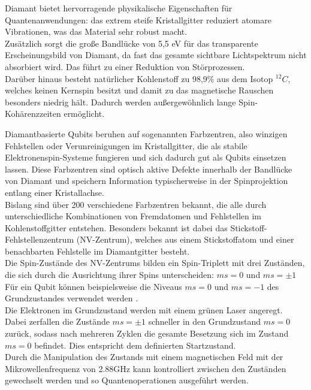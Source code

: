 Diamant bietet hervorragende physikalische Eigenschaften für Quantenanwendungen: das extrem steife Kristallgitter reduziert atomare Vibrationen, was das Material sehr robust macht. \\
Zusätzlich sorgt die große Bandlücke von 5,5 eV für das transparente Erscheinungsbild von Diamant, da fast das gesamte sichtbare Lichtspektrum nicht absorbiert wird. Das führt zu einer Reduktion von Störprozessen. \\
Darüber hinaus besteht natürlicher Kohlenstoff zu 98,9\% aus dem Isotop ${}^{12}C$, welches keinen Kernspin besitzt und damit zu das magnetische Rauschen besonders niedrig hält. Dadurch werden außergewöhnlich lange Spin-Kohärenzzeiten ermöglicht. 




Diamantbasierte Qubits beruhen auf sogenannten Farbzentren, also winzigen Fehlstellen oder Verunreinigungen im Kristallgitter, die als stabile Elektronenspin-Systeme fungieren und sich dadurch gut als Qubits einsetzen lassen. Diese Farbzentren sind optisch aktive Defekte innerhalb der Bandlücke von Diamant und speichern Information typischerweise in der Spinprojektion entlang einer Kristallachse. \\

Bislang sind über 200 verschiedene Farbzentren bekannt, die alle durch unterschiedliche Kombinationen von Fremdatomen und Fehlstellen im Kohlenstoffgitter entstehen. Besonders bekannt ist dabei das Stickstoff-Fehlstellenzentrum (NV-Zentrum), welches aus einem Stickstoffatom und einer benachbarten Fehlstelle im Diamantgitter besteht. \\

Die Spin-Zustände des NV-Zentrums bilden ein Spin-Triplett mit drei Zuständen, die sich durch die Ausrichtung ihrer Spins unterscheiden: $ms = 0$ und $ms = \pm 1$
Für ein Qubit können beispielsweise die Niveaus $ms = 0$ und $ms = -1$ des Grundzustandes verwendet werden . \\
Die Elektronen im Grundzustand werden mit einem grünen Laser angeregt. Dabei zerfallen die Zustände $ms = \pm 1$ schneller in den Grundzustand $ms=0$ zurück, sodass nach mehreren Zyklen die gesamte Besetzung sich im Zustand $ms=0$ befindet. Dies entspricht dem definierten Startzustand. \\

Durch die Manipulation des Zustands mit einem magnetischen Feld mit der Mikrowellenfrequenz von 2.88GHz kann kontrolliert zwischen den Zuständen gewechselt werden und so Quantenoperationen ausgeführt werden. \\

